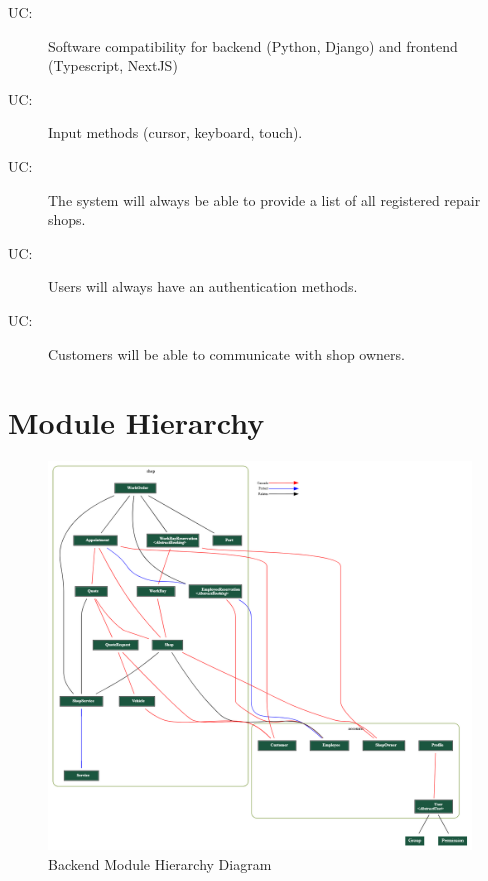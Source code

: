 \documentclass[12pt, titlepage]{article}
\newcounter{ucnum}
\newcommand{\uctheucnum}{UC\theucnum}
\begin{document}
\begin{description}
\item[ \uctheucnum \label{ucLang}:] Software compatibility for backend (Python, Django) and frontend (Typescript, NextJS)
\item[ \uctheucnum \label{ucIO}:]  Input methods (cursor, keyboard, touch).
\item[ \uctheucnum \label{ucShops}:] The system will always be able to provide a list of all registered repair shops.
\item[ \uctheucnum \label{ucAuth}:] Users will always have an authentication methods.
\item[ \uctheucnum \label{ucIO}:] Customers will be able to communicate with shop owners.
\end{description}

\section{Module Hierarchy} \label{SecMH}
\begin{figure}
    \centering
    \includegraphics[scale=0.35]{Design/SoftArchitecture/updated-backend-minimal.png}
    \caption{Backend Module Hierarchy Diagram}
    \label{fig:backend-mh}
\end{figure}
\end{document}
